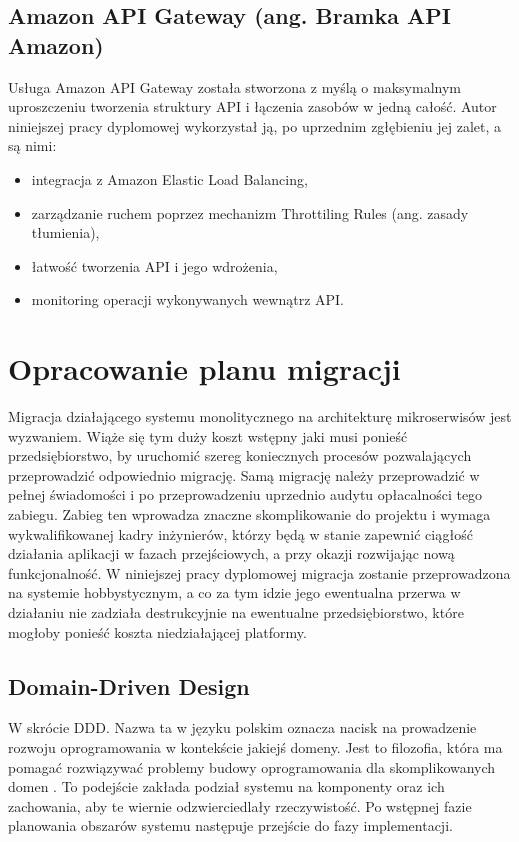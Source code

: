 \documentclass[12pt,twoside]{book}
\begin{document}
    \subsection{Amazon API Gateway (ang. Bramka API Amazon)}
    Usługa Amazon API Gateway została stworzona z myślą o maksymalnym uproszczeniu tworzenia struktury API i łączenia zasobów w jedną całość. Autor niniejszej pracy dyplomowej wykorzystał ją, po uprzednim zgłębieniu jej zalet, a są nimi:

    \begin{itemize}
        \item integracja z Amazon Elastic Load Balancing,
        \item zarządzanie ruchem poprzez mechanizm Throttiling Rules (ang. zasady tłumienia),
        \item łatwość tworzenia API i jego wdrożenia,
        \item monitoring operacji wykonywanych wewnątrz API. \cite{aws.api.gateway}
    \end{itemize}


    \section{Opracowanie planu migracji}
    Migracja działającego systemu monolitycznego na architekturę mikroserwisów jest wyzwaniem. Wiąże się tym duży koszt wstępny jaki musi ponieść przedsiębiorstwo, by uruchomić szereg koniecznych procesów pozwalających przeprowadzić odpowiednio migrację. Samą migrację należy przeprowadzić w pełnej świadomości i po przeprowadzeniu uprzednio audytu opłacalności tego zabiegu. Zabieg ten wprowadza znaczne skomplikowanie do projektu i wymaga wykwalifikowanej kadry inżynierów, którzy będą w stanie zapewnić ciągłość działania aplikacji w fazach przejściowych, a przy okazji rozwijając nową funkcjonalność.
    W niniejszej pracy dyplomowej migracja zostanie przeprowadzona na systemie hobbystycznym, a co za tym idzie jego ewentualna przerwa w działaniu nie zadziała destrukcyjnie na ewentualne przedsiębiorstwo, które mogłoby ponieść koszta niedziałającej platformy.

    \subsection{Domain-Driven Design}
    W skrócie DDD. Nazwa ta w języku polskim oznacza nacisk na prowadzenie rozwoju oprogramowania w kontekście jakiejś domeny. Jest to filozofia, która ma pomagać rozwiązywać problemy budowy oprogramowania dla skomplikowanych domen \cite{patterns.principles.and.practices.of.ddd}.
    To podejście zakłada podział systemu na komponenty oraz ich zachowania, aby te wiernie odzwierciedlały rzeczywistość. Po wstępnej fazie planowania obszarów systemu następuje przejście do fazy implementacji.
\end{document}
